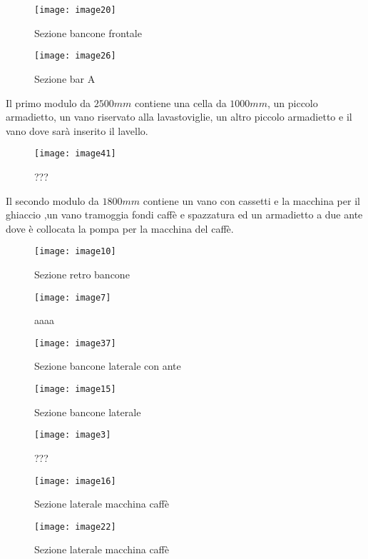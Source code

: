 \begin{figure}[H]
	\centering
	\texttt{[image: image20]}
	\caption{Sezione bancone frontale}
	\label{fig:mesh1}
\end{figure}

\begin{figure}[H]
	\centering
	\texttt{[image: image26]}
	\caption{Sezione bar A}
	\label{fig:mesh1}
\end{figure}

Il primo modulo da $2500mm$ contiene una cella da $1000 mm$, un piccolo armadietto, un vano riservato alla lavastoviglie, un altro piccolo armadietto e il vano dove sarà inserito il lavello.

\begin{figure}[H]
	\centering
	\texttt{[image: image41]}
	\caption{???}
	\label{fig:mesh1}
\end{figure}

Il secondo modulo da $1800 mm$ contiene un vano con cassetti e la macchina per il ghiaccio ,un vano tramoggia fondi caffè e spazzatura ed un armadietto a due ante dove è collocata la pompa per la macchina del caffè.

\begin{figure}[H]
	\centering
	\texttt{[image: image10]}
	\caption{Sezione retro bancone}
	\label{fig:mesh1}
\end{figure}
\begin{figure}[H]
	\centering
	\texttt{[image: image7]}
	\caption{aaaa}
	\label{fig:mesh1}
\end{figure}
\begin{figure}[H]
	\centering
	\texttt{[image: image37]}
	\caption{Sezione bancone laterale con ante}
	\label{fig:mesh1}
\end{figure}
\begin{figure}[H]
	\centering
	\texttt{[image: image15]}
	\caption{Sezione bancone laterale}
	\label{fig:mesh1}
\end{figure}
\begin{figure}[H]
	\centering
	\texttt{[image: image3]}
	\caption{???}
	\label{fig:mesh1}
\end{figure}

\begin{figure}[H]
	\centering
	\texttt{[image: image16]}
	\caption{Sezione laterale macchina caffè}
	\label{fig:mesh1}
\end{figure}
\begin{figure}[H]
	\centering
	\texttt{[image: image22]}
	\caption{Sezione laterale macchina caffè}
	\label{fig:mesh1}
\end{figure}

